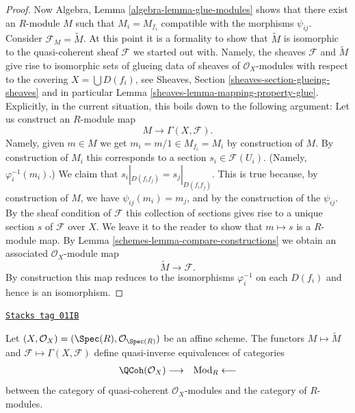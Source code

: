 \begin{proof}
\medskip\noindent
Now Algebra, Lemma \ref{algebra-lemma-glue-modules}
shows that there exist an $R$-module $M$ such that
$M_i = M_{f_i}$ compatible with the morphisms $\psi_{ij}$.
Consider $\mathcal{F}_M = \widetilde M$. At this point it is
a formality to show that $\widetilde M$ is isomorphic to
the quasi-coherent sheaf $\mathcal{F}$ we started out with.
Namely, the sheaves $\mathcal{F}$ and $\widetilde M$ give
rise to isomorphic sets of glueing data of sheaves of $\mathcal{O}_X$-modules
with respect to the covering $X = \bigcup D(f_i)$, see
Sheaves, Section \ref{sheaves-section-glueing-sheaves}
and in particular Lemma \ref{sheaves-lemma-mapping-property-glue}.
Explicitly, in the current situation, this boils down to
the following argument: Let us construct an $R$-module map
$$
M \longrightarrow \Gamma(X, \mathcal{F}).
$$
Namely, given $m \in M$ we get $m_i = m/1 \in M_{f_i} = M_i$
by construction of $M$. By construction of $M_i$ this corresponds
to a section $s_i \in \mathcal{F}(U_i)$. (Namely, $\varphi^{-1}_i(m_i)$.)
We claim that $s_i|_{D(f_if_j)} = s_j|_{D(f_if_j)}$. This is
true because, by construction of $M$, we have $\psi_{ij}(m_i) = m_j$,
and by the construction of the $\psi_{ij}$. By the sheaf condition of
$\mathcal{F}$ this collection of sections gives rise to a unique
section $s$ of $\mathcal{F}$ over $X$. We leave it to the reader
to show that $m \mapsto s$ is a $R$-module map.
By Lemma \ref{schemes-lemma-compare-constructions} we obtain an associated
$\mathcal{O}_X$-module map
$$
\widetilde M \longrightarrow \mathcal{F}.
$$
By construction this map reduces to the isomorphisms
$\varphi_i^{-1}$ on each $D(f_i)$ and hence is an isomorphism.
\end{proof}

\begin{lemma}
\label{schemes-lemma-equivalence-quasi-coherent}
\href{https://stacks.math.columbia.edu/tag/01IB}{\texttt{Stacks tag 01IB}}

Let $(X, \mathcal{O}_X) = (\Spec(R), \mathcal{O}_{\Spec(R)})$
be an affine scheme.
The functors $M \mapsto \widetilde M$ and
$\mathcal{F} \mapsto \Gamma(X, \mathcal{F})$ define quasi-inverse
equivalences of categories
$$
\begin{array}{cc}\QCoh(\mathcal{O}_X)
\longrightarrow & \text{Mod}_R
\longleftarrow\end{array}
$$
between the category of quasi-coherent $\mathcal{O}_X$-modules
and the category of $R$-modules.
\end{lemma}

